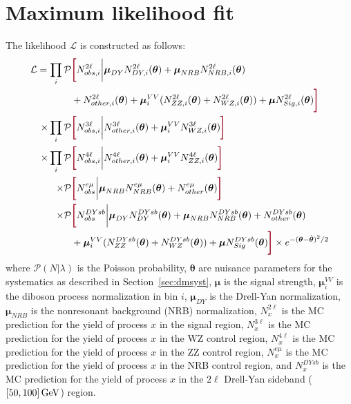 \section{Maximum likelihood fit}
\label{sec:likelihood}
The likelihood $\mathcal{L}$ is constructed as follows:
\begin{equation}
\begin{split}
  \mathcal{L} = \prod_{i} \mathcal{P}&\termLB N^{2\ell}_{obs,i} \bigg| \boldsymbol\mu_{DY} N^{2\ell}_{DY,i}(\boldsymbol\theta) + \boldsymbol\mu_{NRB} N^{2\ell}_{NRB,i}(\boldsymbol\theta) \\
  & + N^{2\ell}_{other,i}(\boldsymbol\theta) + \boldsymbol\mu_i^{VV} (N^{2\ell}_{ZZ,i}(\boldsymbol\theta)+N^{2\ell}_{WZ,i}(\boldsymbol\theta)) + \boldsymbol\mu N^{2\ell}_{Sig,i}(\boldsymbol\theta) \termRB \\
   \times \prod_{i} \mathcal{P} & \termLB N^{3\ell}_{obs,i} \bigg| N^{3\ell}_{other,i}(\boldsymbol\theta) + \boldsymbol\mu_i^{VV} N^{3\ell}_{WZ,i}(\boldsymbol\theta) \termRB \\
   \times \prod_{i} \mathcal{P} & \termLB N^{4\ell}_{obs,i} \bigg| N^{4\ell}_{other,i}(\boldsymbol\theta) + \boldsymbol\mu_i^{VV} N^{4\ell}_{ZZ,i}(\boldsymbol\theta) \termRB \\
   \times \mathcal{P}&\termLB N^{e\mu}_{obs} \bigg| \boldsymbol\mu_{NRB} N^{e\mu}_{NRB}(\boldsymbol\theta) + N^{e\mu}_{other}(\boldsymbol\theta) \termRB \\
   \times \mathcal{P}&\termLB N^{DYsb}_{obs} \bigg| \boldsymbol\mu_{DY} N^{DYsb}_{DY}(\boldsymbol\theta) + \boldsymbol\mu_{NRB} N^{DYsb}_{NRB}(\boldsymbol\theta) + N^{DYsb}_{other}(\boldsymbol\theta) \\
   & + \boldsymbol\mu_i^{VV} (N^{DYsb}_{ZZ}(\boldsymbol\theta)+N^{DYsb}_{WZ}(\boldsymbol\theta)) + \boldsymbol\mu N^{DYsb}_{Sig}(\boldsymbol\theta) \termRB  \times e^{-({\boldsymbol\theta}-\hat{{\boldsymbol\theta}})^2/2}
\end{split}
\end{equation}
where $\mathcal{P}(N|\lambda)$ is the Poisson probability,
${\boldsymbol\theta}$ are nuisance parameters for the systematics as described in Section~\ref{sec:dmsyst},
$\boldsymbol\mu$ is the signal strength,
$\boldsymbol\mu_i^{VV}$ is the diboson process normalization in bin $i$,
$\boldsymbol\mu_{DY}$ is the Drell-Yan normalization,
$\boldsymbol\mu_{NRB}$ is the nonresonant background (NRB) normalization,
$N^{2\ell}_{x}$ is the MC prediction for the yield of process $x$ in the signal region,
$N^{3\ell}_{x}$ is the MC prediction for the yield of process $x$ in the WZ control region,
$N^{4\ell}_{x}$ is the MC prediction for the yield of process $x$ in the ZZ control region,
$N^{e\mu}_{x}$ is the MC prediction for the yield of process $x$ in the NRB control region,
and $N^{DYsb}_{x}$ is the MC prediction for the yield of process $x$ in the $2\ell$ Drell-Yan sideband ($[50,100]\,\text{Ge\hspace{-.08em}V}$) region.
